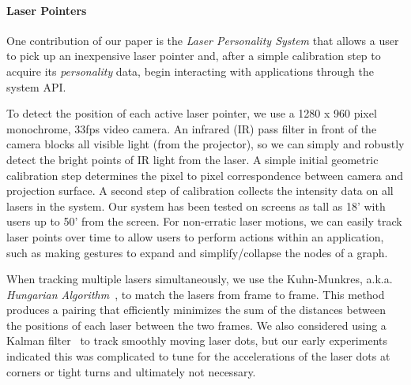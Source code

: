 \documentclass[runningheads,a4paper]{llncs}
\begin{document}
\vspace*{-0.1in}
\paragraph{\bf Laser Pointers}

One contribution of our paper is the
\textit{Laser Personality System} that allows a user to pick up an
inexpensive laser pointer and, after a simple calibration step to
acquire its \textit{personality} data, begin interacting with
applications through the system API.


To detect the  position of each active laser pointer, we use a
1280 x 960 pixel monochrome, 33fps video camera.  An infrared (IR)
pass filter in front of the camera blocks all visible light (from the
projector), so we can simply and robustly detect the bright points of IR light
from the laser.  
%
A simple initial geometric calibration step
determines the pixel to pixel correspondence between camera and
projection surface.  A second step of calibration collects the
intensity data on all lasers in the system.  Our system has been
tested on screens as tall as 18' with users up to 50' from the screen.
For non-erratic
laser motions, we can easily track laser points over time to allow
users to perform actions within an application,
such as making gestures to expand and simplify/collapse the nodes of a graph.

When tracking multiple lasers simultaneously, we use the Kuhn-Munkres,
a.k.a. {\em Hungarian
  Algorithm}~\cite{kuhn,munkres,munkres_implementation}, to match the
lasers from frame to frame.  This method produces a pairing that
efficiently minimizes the sum of the distances between the positions
of each laser between the two frames.  
 We also considered using a
 Kalman filter~\cite{Kalman} to track smoothly moving laser dots, but
 our early experiments indicated this was complicated to tune for the
 accelerations of the laser dots at corners or tight turns and
 ultimately not necessary.
\end{document}

